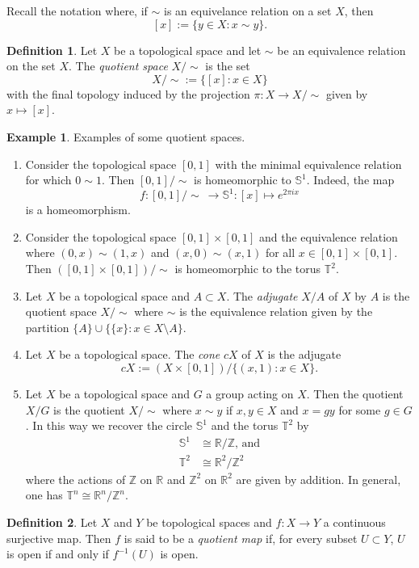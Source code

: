 \documentclass{book}
\theoremstyle{definition}
\newtheorem{definition}{Definition}[section]
\newtheorem{example}{Example}[section]
\theoremstyle{remark}
\newcommand{\R}{\mathbb{R}}
\newcommand{\Z}{\mathbb{Z}}
\begin{document}
Recall the notation where, if $\sim$ is an equivelance relation on a set $X$, then
$$[x]:=\{y\in X:x\sim y\}.$$

\begin{definition}
Let $X$ be a topological space and let $\sim$ be an equivalence relation on the set $X$. The \textit{quotient space} $X/{\sim}$ is the set
$$X/{\sim}:=\{[x]:x\in X\}$$
with the final topology induced by the projection $\pi:X\to X/{\sim}$ given by $x\mapsto [x]$.
\end{definition}

\begin{example}Examples of some quotient spaces.
\begin{enumerate}
    \item Consider the topological space $[0,1]$ with the minimal equivalence relation for which $0\sim 1$. Then $[0,1]/\sim$ is homeomorphic to $\mathbb S^1$. Indeed, the map
    $$f:[0,1]/\sim\:\to\mathbb S^1:[x]\mapsto e^{2\pi ix}$$
    is a homeomorphism.
    \item Consider the topological space $[0,1]\times[0,1]$ and the equivalence relation where $(0,x)\sim(1,x)$ and $(x,0)\sim (x,1)$ for all $x\in[0,1]\times[0,1]$. Then $([0,1]\times[0,1])/\sim$ is homeomorphic to the torus $\mathbb T^2$.
    \item Let $X$ be a topological space and $A\subset X$. The \textit{adjugate} $X/A$ of $X$ by $A$ is the quotient space $X/{\sim}$ where $\sim$ is the equivalence relation given by the partition $\{A\}\cup\{\{x\} : x\in X\setminus A\}$.
    \item Let $X$ be a topological space. The \textit{cone} $cX$ of $X$ is the adjugate $$cX:=(X\times[0,1])/\{(x,1):x\in X\}.$$
    \item Let $X$ be a topological space and $G$ a group acting on $X$. Then the quotient $X/G$ is the quotient $X/{\sim}$ where $x\sim y$ if $x,y\in X$ and $x=gy$ for some $g\in G$. In this way we recover the circle $\mathbb S^1$ and the torus $\mathbb T^2$ by
    \begin{align*}
        \mathbb S^1&\cong \R/\Z\text{, and}\\
        \mathbb T^2&\cong \R^2/\Z^2
    \end{align*}
    where the actions of $\Z$ on $\R$ and $\Z^2$ on $\R^2$ are given by addition. In general, one has $\mathbb T^n\cong\R^n/\Z^n$.
\end{enumerate}
\end{example}

\begin{definition}
Let $X$ and $Y$ be topological spaces and $f:X\to Y$ a continuous surjective map. Then $f$ is said to be a \textit{quotient map} if, for every subset $U\subset Y$, $U$ is open if and only if $f^{-1}(U)$ is open.
\end{definition}
\end{document}
